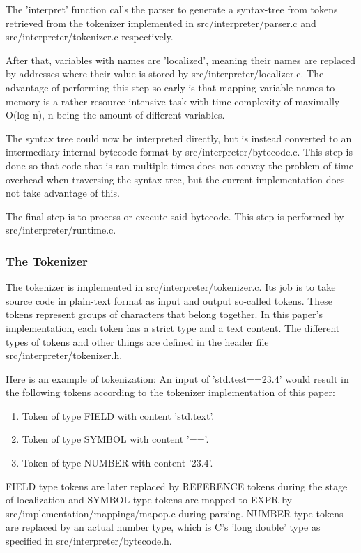 \documentclass[12pt,a4paper,man]{apa7}
\begin{document}
The 'interpret' function calls the parser to generate a syntax-tree from tokens retrieved
from the tokenizer implemented in src/interpreter/parser.c and 
src/interpreter/tokenizer.c respectively.

After that, variables with names are 'localized', meaning their names are
replaced by addresses where their value is stored by src/interpreter/localizer.c.
The advantage of performing this step so early is that mapping variable names
to memory is a rather resource-intensive task with time complexity of maximally 
O(log n), n being the amount of different variables.

The syntax tree could now be interpreted directly, but is instead converted
to an intermediary internal bytecode format by src/interpreter/bytecode.c.
This step is done so that code that is ran multiple times does not convey
the problem of time overhead when traversing the syntax tree, but the current
implementation does not take advantage of this.

The final step is to process or execute said bytecode. This step is performed
by src/interpreter/runtime.c.

\subsubsection{The Tokenizer}
The tokenizer is implemented in src/interpreter/tokenizer.c. Its job is to
take source code in plain-text format as input and output so-called tokens.
These tokens represent groups of characters that belong together. In this paper's
implementation, each token has a strict type and a text content.
The different types of tokens and other things are defined in the header file
src/interpreter/tokenizer.h.

Here is an example of tokenization:
An input of 'std.test==23.4' would result in the following tokens according
to the tokenizer implementation of this paper:
\begin{enumerate}
    \item Token of type FIELD with content 'std.text'.
    \item Token of type SYMBOL with content '=='.
    \item Token of type NUMBER with content '23.4'.
\end{enumerate}
FIELD type tokens are later replaced by REFERENCE tokens during the stage of localization
and SYMBOL type tokens are mapped to EXPR by src/implementation/mappings/mapop.c
during parsing. NUMBER type tokens are replaced by an actual number type, which
is C's 'long double' type as specified in src/interpreter/bytecode.h.
\end{document}
